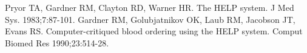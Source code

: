 \documentclass{amia}
\begin{document}
\makeatletter
\renewcommand{\@biblabel}[1]{\hfill #1.}
\makeatother




\begin{thebibliography}{1}
\setlength\itemsep{-0.1em}

Pryor TA, Gardner RM, Clayton RD, Warner HR. The HELP system. J Med Sys. 1983;7:87-101.
Gardner RM, Golubjatnikov OK, Laub RM, Jacobson JT, Evans RS. Computer-critiqued blood ordering using the HELP system. Comput Biomed Res 1990;23:514-28.



\end{thebibliography}
\end{document}

